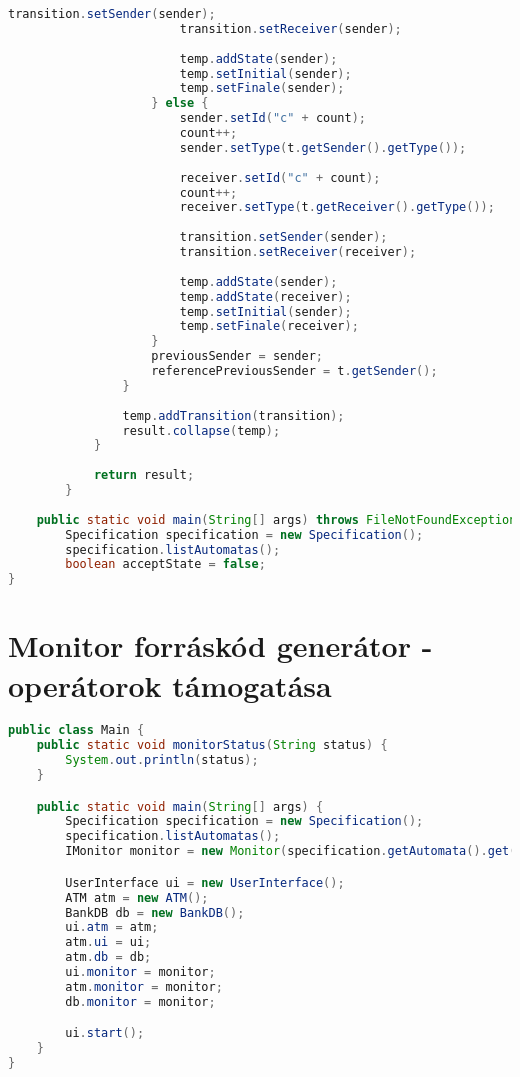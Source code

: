 \begin{lstlisting}[language=java, caption={Specification osztály.},captionpos=b]
                        transition.setSender(sender);
                        transition.setReceiver(sender);
    
                        temp.addState(sender);
                        temp.setInitial(sender);
                        temp.setFinale(sender);
                    } else {
                        sender.setId("c" + count);
                        count++;
                        sender.setType(t.getSender().getType());
    
                        receiver.setId("c" + count);
                        count++;
                        receiver.setType(t.getReceiver().getType());
    
                        transition.setSender(sender);
                        transition.setReceiver(receiver);
    
                        temp.addState(sender);
                        temp.addState(receiver);
                        temp.setInitial(sender);
                        temp.setFinale(receiver);
                    }
                    previousSender = sender;
                    referencePreviousSender = t.getSender();
                }
    
                temp.addTransition(transition);
                result.collapse(temp);
            }
    
            return result;
        }
	
	public static void main(String[] args) throws FileNotFoundException, UnsupportedEncodingException{
		Specification specification = new Specification();
		specification.listAutomatas();
		boolean acceptState = false;
}
\end{lstlisting}

\clearpage\section{Monitor forráskód generátor - operátorok támogatása}

\begin{lstlisting}[language=java, frame=single, float=ht!, caption={7.1. scenariohoz tartozó Main osztály.},captionpos=b]
public class Main {
	public static void monitorStatus(String status) {
		System.out.println(status);
	}

	public static void main(String[] args) {
		Specification specification = new Specification();
		specification.listAutomatas();
		IMonitor monitor = new Monitor(specification.getAutomata().get(0));

		UserInterface ui = new UserInterface();
		ATM atm = new ATM();
		BankDB db = new BankDB();
		ui.atm = atm;
		atm.ui = ui;
		atm.db = db;
		ui.monitor = monitor;
		atm.monitor = monitor;
		db.monitor = monitor;

		ui.start();
	}
}
\end{lstlisting}

